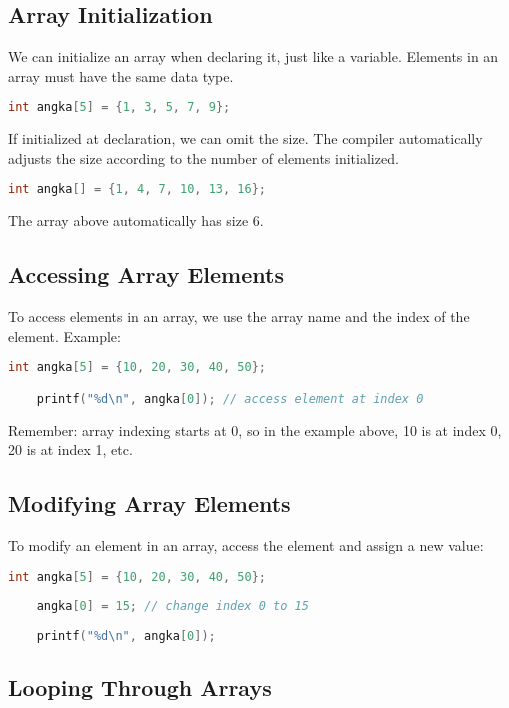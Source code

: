 \subsection{Array Initialization}

We can initialize an array when declaring it, just like a variable.  
Elements in an array must have the same data type.

\begin{lstlisting}[language=c]
	int angka[5] = {1, 3, 5, 7, 9};
\end{lstlisting}

If initialized at declaration, we can omit the size.  
The compiler automatically adjusts the size according to the number of elements initialized.

\begin{lstlisting}[language=c]
	int angka[] = {1, 4, 7, 10, 13, 16};
\end{lstlisting}

The array above automatically has size 6.

\subsection{Accessing Array Elements}

To access elements in an array, we use the array name and the index of the element.
Example:
\begin{lstlisting}[language=c]
	int angka[5] = {10, 20, 30, 40, 50};

	printf("%d\n", angka[0]); // access element at index 0
\end{lstlisting}

Remember: array indexing starts at 0, so in the example above, 10 is at index 0, 20 is at index 1, etc.

\subsection{Modifying Array Elements}

To modify an element in an array, access the element and assign a new value:

\begin{lstlisting}[language=c]
	int angka[5] = {10, 20, 30, 40, 50};
	
	angka[0] = 15; // change index 0 to 15
	
	printf("%d\n", angka[0]);
\end{lstlisting}

\subsection{Looping Through Arrays}

